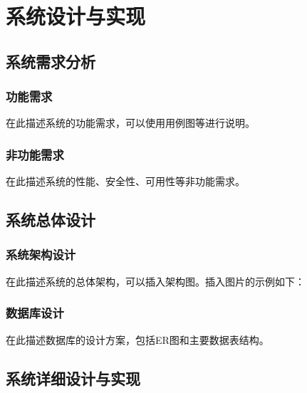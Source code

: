\chapter{系统设计与实现}


\section{系统需求分析}

\subsection{功能需求}

在此描述系统的功能需求，可以使用用例图等进行说明。

\subsection{非功能需求}

在此描述系统的性能、安全性、可用性等非功能需求。

\section{系统总体设计}

\subsection{系统架构设计}

在此描述系统的总体架构，可以插入架构图。插入图片的示例如下：



\subsection{数据库设计}

在此描述数据库的设计方案，包括ER图和主要数据表结构。

\section{系统详细设计与实现}

